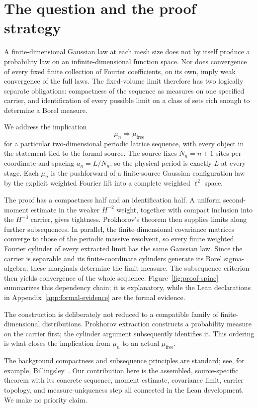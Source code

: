 \section{The question and the proof strategy}

A finite-dimensional Gaussian law at each mesh size does not by itself produce a probability law on an infinite-dimensional function space. Nor does convergence of every fixed finite collection of Fourier coefficients, on its own, imply weak convergence of the full laws. The fixed-volume limit therefore has two logically separate obligations: compactness of the sequence as measures on one specified carrier, and identification of every possible limit on a class of sets rich enough to determine a Borel measure.

We address the implication
\[
  \mu_n \Longrightarrow \mu_{\mathrm{free}}
\]
for a particular two-dimensional periodic lattice sequence, with every object in the statement tied to the formal source. The source fixes $N_n=n+1$ sites per coordinate and spacing $a_n=L/N_n$, so the physical period is exactly $L$ at every stage. Each $\mu_n$ is the pushforward of a finite-source Gaussian configuration law by the explicit weighted Fourier lift into a complete weighted $\ell^2$ space.

The proof has a compactness half and an identification half. A uniform second-moment estimate in the weaker $H^{-2}$ weight, together with compact inclusion into the $H^{-3}$ carrier, gives tightness. Prokhorov's theorem then supplies limits along further subsequences. In parallel, the finite-dimensional covariance matrices converge to those of the periodic massive resolvent, so every finite weighted Fourier cylinder of every extracted limit has the same Gaussian law. Since the carrier is separable and its finite-coordinate cylinders generate its Borel sigma-algebra, these marginals determine the limit measure. The subsequence criterion then yields convergence of the whole sequence. Figure~\ref{fig:proof-spine} summarizes this dependency chain; it is explanatory, while the Lean declarations in Appendix~\ref{app:formal-evidence} are the formal evidence.

The construction is deliberately not reduced to a compatible family of finite-dimensional distributions. Prokhorov extraction constructs a probability measure on the carrier first; the cylinder argument subsequently identifies it. This ordering is what closes the implication from $\mu_n$ to an actual $\mu_{\mathrm{free}}$.

The background compactness and subsequence principles are standard; see, for example, Billingsley~\cite{billingsley}. Our contribution here is the assembled, source-specific theorem with its concrete sequence, moment estimate, covariance limit, carrier topology, and measure-uniqueness step all connected in the Lean development. We make no priority claim.
